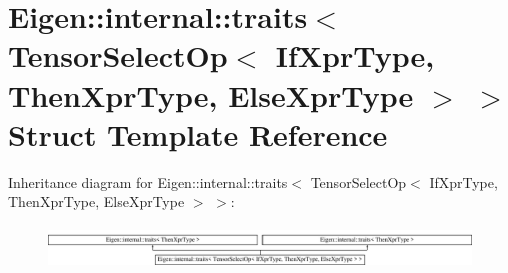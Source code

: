 \hypertarget{struct_eigen_1_1internal_1_1traits_3_01_tensor_select_op_3_01_if_xpr_type_00_01_then_xpr_type_00_01_else_xpr_type_01_4_01_4}{}\section{Eigen\+:\+:internal\+:\+:traits$<$ Tensor\+Select\+Op$<$ If\+Xpr\+Type, Then\+Xpr\+Type, Else\+Xpr\+Type $>$ $>$ Struct Template Reference}
\label{struct_eigen_1_1internal_1_1traits_3_01_tensor_select_op_3_01_if_xpr_type_00_01_then_xpr_type_00_01_else_xpr_type_01_4_01_4}
Inheritance diagram for Eigen\+:\+:internal\+:\+:traits$<$ Tensor\+Select\+Op$<$ If\+Xpr\+Type, Then\+Xpr\+Type, Else\+Xpr\+Type $>$ $>$\+:\begin{figure}[H]
\begin{center}
\leavevmode
\includegraphics[height=1.129032cm]{struct_eigen_1_1internal_1_1traits_3_01_tensor_select_op_3_01_if_xpr_type_00_01_then_xpr_type_00_01_else_xpr_type_01_4_01_4}
\end{center}
\end{figure}
